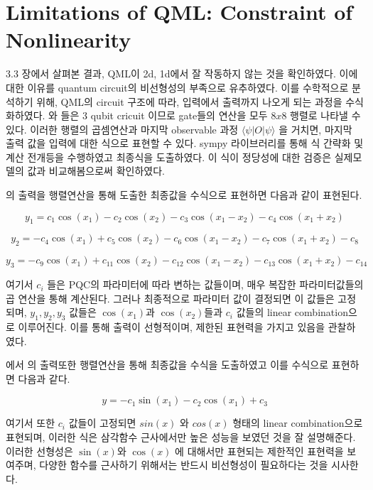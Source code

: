 \section{Limitations of QML: Constraint of Nonlinearity}

3.3 장에서 살펴본 결과, QML이 2d, 1d에서 잘 작동하지 않는 것을 확인하였다. 이에 대한 이유를 quantum circuit의 비선형성의 부족으로 유추하였다. 이를 수학적으로 분석하기 위해, QML의 circuit 구조에 따라, 입력에서 출력까지 나오게 되는 과정을 수식화하였다.  와 들은 3 qubit cricuit 이므로 gate들의 연산을 모두 $8x8$ 행렬로 나타낼 수 있다. 이러한 행렬의 곱셈연산과 마지막 observable 과정 $ \langle \psi | O | \psi \rangle$ 을 거치면, 마지막 출력 값을 입력에 대한 식으로 표현할 수 있다.  sympy 라이브러리를 통해 식 간략화 및 계산 전개등을 수행하였고 최종식을 도출하였다. 이 식이 정당성에 대한 검증은 실제모델의 값과 비교해봄으로써 확인하였다.

  의 출력을 행렬연산을 통해 도출한 최종값을 수식으로 표현하면 다음과 같이 표현된다.

\begin{equation*}
    y_1  = c_1\cos{\left(x_{1} \right)} - c_2\cos{\left(x_{2} \right)} - c_3\cos{\left(x_{1} - x_{2} \right)} - c_4\cos{\left(x_{1} + x_{2} \right)}
\end{equation*}


\begin{equation*}
y_2  = - c_4\cos{\left(x_{1} \right)} + c_5\cos{\left(x_{2} \right)} - c_6\cos{\left(x_{1} - x_{2} \right)} - c_7\cos{\left(x_{1} + x_{2} \right)} - c_8
\end{equation*}

\begin{equation*}
   y_3 =  -c_9 \cos{\left(x_{1} \right)} + c_{11} \cos{\left(x_{2} \right)} - c_{12} \cos{\left(x_{1} - x_{2} \right)} - c_{13} \cos{\left(x_{1} + x_{2} \right)} - c_{14}
\end{equation*}


여기서 $ c_i $ 들은 PQC의 파라미터에 따라 변하는 값들이며, 매우 복잡한 파라미터값들의 곱 연산을 통해 계산된다. 그러나 최종적으로 파라미터 값이 결정되면 이 값들은 고정되며, $ y_1 ,y_2 , y_3 $ 값들은  $\cos(x_1)$과 $\cos(x_2)$들과 $c_i$ 값들의 linear combination으로 이루어진다. 이를 통해 출력이 선형적이며, 제한된 표현력을 가지고 있음을 관찰하였다.

\clearpage

에서 의 출력또한 행렬연산을 통해 최종값을 수식을 도출하였고 이를 수식으로 표현하면 다음과 같다.

\begin{equation*}
 y = - c_1 \sin{\left(x_{1} \right)} - c_2 \cos{\left(x_{1} \right)} + c_3
\end{equation*}

여기서 또한 $c_i$ 값들이 고정되면  $sin(x)$ 와 $cos(x)$ 형태의 linear combination으로 표현되며, 이러한 식은 삼각함수 근사에서만 높은 성능을 보였던 것을 잘 설명해준다. 이러한 선형성은 $\sin(x)$와 $\cos(x)$ 에 대해서만 표현되는 제한적인 표현력을 보여주며, 다양한 함수를 근사하기 위해서는 반드시 비선형성이 필요하다는 것을 시사한다.

